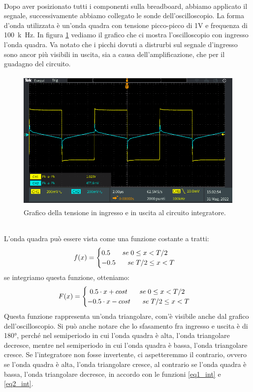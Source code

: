\documentclass{report}
\begin{document}
\\\indent Dopo aver posizionato tutti i componenti sulla breadboard, abbiamo applicato il segnale, successivamente abbiamo collegato le sonde dell'oscilloscopio. La forma d'onda utilizzata è un'onda quadra con tensione picco-picco di 1V e frequenza di \SI{100}{k\hertz}. In figura \ref{figura:oscillo15} vediamo il grafico che ci mostra l'oscilloscopio con ingresso l'onda quadra. Va notato che i picchi dovuti a distrurbi sul segnale d'ingresso sono ancor più visibili in uscita, sia a causa dell'amplificazione, che per il guadagno del circuito. 
\begin{figure}[h!]
\centering
\includegraphics[height=7cm]{immagini/oscillo15}
\caption{Grafico della tensione in ingresso e in uscita al circuito integratore.}
\label{figura:oscillo15}
\end{figure}
\\L'onda quadra può essere vista come una funzione costante a tratti:
\begin{equation}
	f(x)=\label{eq1_int}
	\begin{cases}
		0.5\indent\;se\;0\le x<T/2 \\
		-0.5\indent\;se\;T/2\le x<T 
	\end{cases}
\end{equation}
se integriamo questa funzione, otteniamo:
\begin{equation}
	F(x)=\label{eq2_int}
	\begin{cases}
		~0.5\cdot x + cost\indent\;se\;0\le x<T/2 \\
		-0.5\cdot x - cost\indent\;se\;T/2\le x<T 
	\end{cases}
\end{equation}
Questa funzione rappresenta un'onda triangolare, com'è visibile anche dal grafico dell'oscilloscopio. Si può anche notare che lo sfasamento fra ingresso e uscita è di 180°, perché nel semiperiodo in cui l'onda quadra è alta, l'onda triangolare decresce, mentre nel semiperiodo in cui l'onda quadra è bassa, l'onda triangolare cresce. Se l'integratore non fosse invertente, ci aspetteremmo il contrario, ovvero se l'onda quadra è alta, l'onda triangolare cresce, al contrario se l'onda quadra è bassa, l'onda triangolare decresce, in accordo con le funzioni \eqref{eq1_int} e \eqref{eq2_int}.


\end{document}
